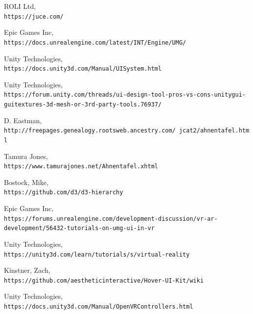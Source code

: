 \documentclass[onecolumn, draftclsnofoot,10pt, compsoc]{IEEEtran}
\begin{document}
\newpage
\begin{thebibliography}{9}
ROLI Ltd,
\\\texttt{https://juce.com/}

Epic Games Inc,
\\\texttt{https://docs.unrealengine.com/latest/INT/Engine/UMG/}

Unity Technologies,
\\\texttt{https://docs.unity3d.com/Manual/UISystem.html}

Unity Technologies,
\\\texttt{https://forum.unity.com/threads/ui-design-tool-pros-vs-cons-unitygui-guitextures-3d-mesh-or-3rd-party-tools.76937/}

D. Eastman,
\\\texttt{http://freepages.genealogy.rootsweb.ancestry.com/~jcat2/ahnentafel.html}

Tamura Jones,
\\\texttt{https://www.tamurajones.net/Ahnentafel.xhtml}

Bostock, Mike,
\\\texttt{https://github.com/d3/d3-hierarchy}

Epic Games Inc,
\\\texttt{https://forums.unrealengine.com/development-discussion/vr-ar-development/56432-tutorials-on-umg-ui-in-vr}

Unity Technologies,
\\\texttt{https://unity3d.com/learn/tutorials/s/virtual-reality}

Kinstner, Zach,
\\\texttt{https://github.com/aestheticinteractive/Hover-UI-Kit/wiki}

Unity Technologies,
\\\texttt{https://docs.unity3d.com/Manual/OpenVRControllers.html}

\end{thebibliography}
\end{document}

